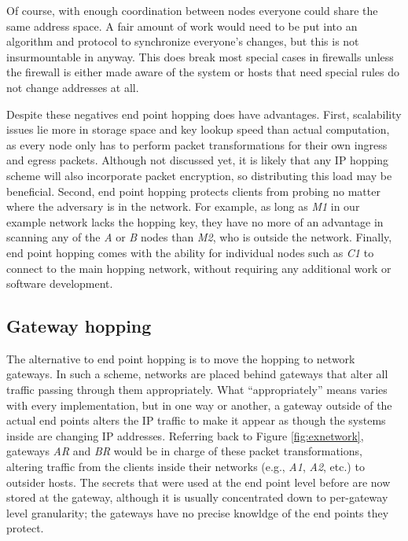 \par Of course, with enough coordination between nodes everyone could share the same address space. A fair amount of work would need to be put into an algorithm and protocol to synchronize everyone's changes, but this is not insurmountable in anyway. This does break most special cases in firewalls unless the firewall is either made aware of the system or hosts that need special rules do not change addresses at all.

\par Despite these negatives end point hopping does have advantages. First, scalability issues lie more in storage space and key lookup speed than actual computation, as every node only has to perform packet transformations for their own ingress and egress packets. Although not discussed yet, it is likely that any IP hopping scheme will also incorporate packet encryption, so distributing this load may be beneficial. Second, end point hopping protects clients from probing no matter where the adversary is in the network. For example, as long as \textit{M1} in our example network lacks the hopping key, they have no more of an advantage in scanning any of the \textit{A} or \textit{B} nodes than \textit{M2}, who is outside the network. Finally, end point hopping comes with the ability for individual nodes such as \textit{C1} to connect to the main hopping network, without requiring any additional work or software development.

\subsection{Gateway hopping}
\label{sec:gateway_hopping}
\par The alternative to end point hopping is to move the hopping to network gateways. In such a scheme, networks are placed behind gateways that alter all traffic passing through them appropriately. What ``appropriately'' means varies with every implementation, but in one way or another, a gateway outside of the actual end points alters the IP traffic to make it appear as though the systems inside are changing IP addresses. Referring back to Figure \ref{fig:exnetwork}, gateways \textit{AR} and \textit{BR} would be in charge of these packet transformations, altering traffic from the clients inside their networks (e.g., \textit{A1}, \textit{A2}, etc.) to outsider hosts. The secrets that were used at the end point level before are now stored at the gateway, although it is usually concentrated down to per-gateway level granularity; the gateways have no precise knowldge of the end points they protect.

